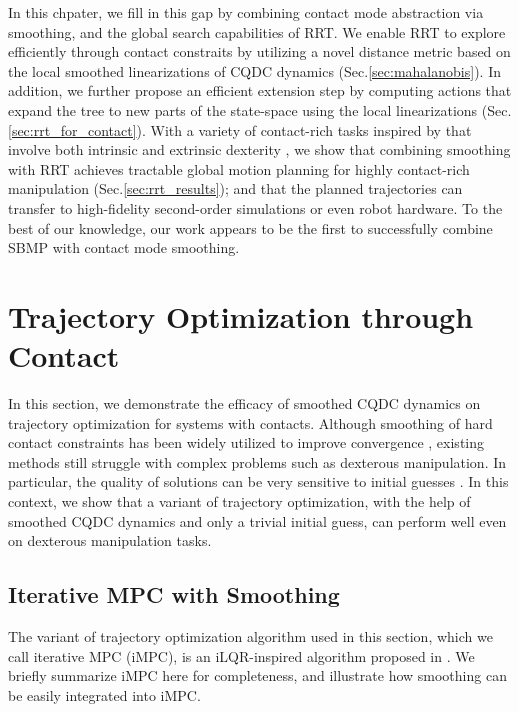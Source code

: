 In this chpater, we fill in this gap by combining contact mode abstraction via smoothing, and the global search capabilities of RRT. We enable RRT to explore efficiently through contact constraits by utilizing a novel distance metric based on the local smoothed linearizations of CQDC dynamics (Sec.\ref{sec:mahalanobis}). In addition, we further propose an efficient extension step by computing actions that expand the tree to new parts of the state-space using the local linearizations (Sec.\ref{sec:rrt_for_contact}). With a variety of contact-rich tasks inspired by \cite{rajeswaran2018learning} that involve both intrinsic and extrinsic dexterity \cite{extrinsic}, we show that combining smoothing with RRT achieves tractable global motion planning for highly contact-rich manipulation (Sec.\ref{sec:rrt_results}); and that the planned trajectories can transfer to high-fidelity second-order simulations or even robot hardware. To the best of our knowledge, our work appears to be the first to successfully combine SBMP with contact mode smoothing.

\section{Trajectory Optimization through Contact \label{sec:traj_opt}}
\noindent 
In this section, we demonstrate the efficacy of smoothed CQDC dynamics on trajectory optimization for systems with contacts.
Although smoothing of hard contact constraints has been widely utilized to improve convergence \cite{posa2014direct, howell2022dojo, howell2022trajectory}, existing methods still struggle with complex problems such as dexterous manipulation. In particular, the quality of solutions can be very sensitive to initial guesses \cite{onol2020tuning}.
In this context, we show that a variant of trajectory optimization, with the help of smoothed CQDC dynamics and only a trivial initial guess, can perform well even on dexterous manipulation tasks.

\subsection{Iterative MPC with Smoothing \label{sec:iMPC}}
The variant of trajectory optimization algorithm used in this section, which we call iterative MPC (iMPC), is an iLQR-inspired algorithm proposed in \cite{bundledgradients}. We briefly summarize iMPC here for completeness, and illustrate how smoothing can be easily integrated into iMPC.

